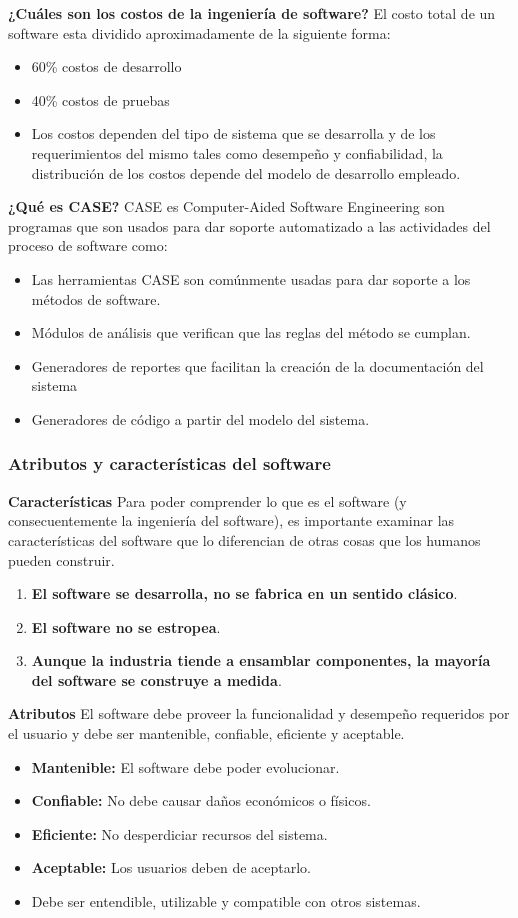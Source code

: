 \documentclass[12pt,twoside]{article}
\begin{document}
\textbf{¿Cuáles son los costos de la ingeniería de software?}
El costo total de un software esta dividido aproximadamente de la siguiente forma:
\begin{itemize}
    \item 60\% costos de desarrollo
    \item 40\% costos de pruebas
    \item Los costos dependen del tipo de sistema que se desarrolla y de los 
    requerimientos del mismo tales como desempeño y confiabilidad, la distribución de 
    los costos depende del modelo de desarrollo empleado. 
\end{itemize}
\textbf{¿Qué es CASE?}
CASE es Computer-Aided Software Engineering son programas que son usados para dar
soporte automatizado a las actividades del proceso de software como:
\begin{itemize}
    \item Las herramientas CASE son comúnmente usadas para dar soporte a los métodos de
    software.
    \item Módulos de análisis que verifican que las reglas del método se cumplan.
    \item Generadores de reportes que facilitan la creación de la documentación del sistema
    \item Generadores de código a partir del modelo del sistema.
\end{itemize}
\subsubsection{Atributos y características del software}
\textbf{Características}
Para poder comprender lo que es el software (y consecuentemente la ingeniería del 
software), es importante examinar las características del software que lo diferencian de 
otras cosas que los humanos pueden construir.
\begin{enumerate}
    \item \textbf{El software se desarrolla, no se fabrica en un sentido clásico}.
    \item \textbf{El software no se estropea}.
    \item \textbf{Aunque la industria tiende a ensamblar componentes, la mayoría del software 
    se construye a medida}.
\end{enumerate}
\textbf{Atributos}
El software debe proveer la funcionalidad y desempeño requeridos por el usuario y
debe ser mantenible, confiable, eficiente y aceptable.
\begin{itemize}
    \item \textbf{Mantenible:} El software debe poder evolucionar.
    \item \textbf{Confiable:} No debe causar daños económicos o físicos.
    \item \textbf{Eficiente:} No desperdiciar recursos del sistema.
    \item \textbf{Aceptable:} Los usuarios deben de aceptarlo.
    \item Debe ser entendible, utilizable y compatible con otros sistemas.
\end{itemize}
\end{document}
